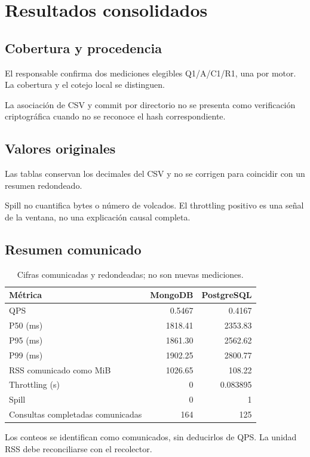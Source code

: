 \section{Resultados consolidados}
\subsection{Cobertura y procedencia}
El responsable confirma dos mediciones elegibles Q1/A/C1/R1, una por
motor. La cobertura y el cotejo local se distinguen.



La asociación de CSV y commit por directorio no se presenta como
verificación criptográfica cuando no se reconoce el hash correspondiente.

\subsection{Valores originales}
Las tablas conservan los decimales del CSV y no se corrigen para
coincidir con un resumen redondeado.

Spill no cuantifica bytes o número de volcados. El throttling positivo
es una señal de la ventana, no una explicación causal completa.

\subsection{Resumen comunicado}
\begin{table}[!htbp]\centering\small
\caption{Cifras comunicadas y redondeadas; no son nuevas mediciones.}
\begin{tabular}{lrr}\toprule
Métrica & MongoDB & PostgreSQL\\\midrule
QPS & 0.5467 & 0.4167\\
P50 (ms) & 1818.41 & 2353.83\\
P95 (ms) & 1861.30 & 2562.62\\
P99 (ms) & 1902.25 & 2800.77\\
RSS comunicado como MiB & 1026.65 & 108.22\\
Throttling (s) & 0 & 0.083895\\
Spill & 0 & 1\\
Consultas completadas comunicadas & 164 & 125\\
\bottomrule\end{tabular}
\end{table}
Los conteos se identifican como comunicados, sin deducirlos de QPS.
La unidad RSS debe reconciliarse con el recolector.

